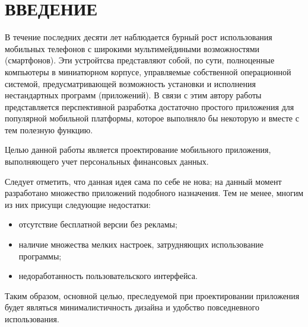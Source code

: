 \section*{ВВЕДЕНИЕ}

В течение последних десяти лет наблюдается бурный рост
использования мобильных телефонов с широкими мультимейдиными
возможностями (смартфонов). Эти устройтсва представляют собой,
по сути, полноценные компьютеры в миниатюрном корпусе,
управляемые собственной операционной системой,
предусматривающей возможность установки и исполнения
нестандартных программ (приложений).
В связи с этим автору работы представляется перспективной разработка
достаточно простого приложения для популярной мобильной платформы,
которое выполняло бы некоторую и вместе с тем полезную функцию.

Целью данной работы является проектирование мобильного приложения,
выполняющего учет персональных финансовых данных.

Следует отметить, что данная идея сама по себе не нова;
на данный момент разработано множество приложений подобного назначения.
Тем не менее, многим из них присущи следующие недостатки:
\begin{itemize}
\item отсутствие бесплатной версии без рекламы;
\item наличие множества мелких настроек, затрудняющих использование программы;
\item недоработанность пользовательского интерфейса.
\end{itemize}

Таким образом, основной целью, преследуемой при проектировании приложения
будет являться минималистичность дизайна и удобство повседневного использования.
